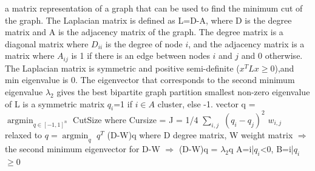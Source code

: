 \documentclass[10pt]{article}
\begin{document}
\smallbreak
{}
 a matrix representation of a graph that can be used to find the minimum cut of the graph. The Laplacian matrix is defined as L=D-A, where D is the degree matrix and A is the adjacency matrix of the graph. The degree matrix is a diagonal matrix where $D_{ii}$ is the degree of node $i$, and the adjacency matrix is a matrix where $A_{ij}$ is 1 if there is an edge between nodes $i$ and $j$ and 0 otherwise. The Laplacian matrix is symmetric and positive semi-definite ($x^TLx\geq0$),and min eigenvalue is 0. The eigenvector that corresponds to the second minimum eigenvalue $\lambda_2$ gives the best bipartite graph partition
 smallest non-zero eigenvalue of L
 is a symmetric matrix
  $q_i$=1 if $i \in A$ cluster, else -1. vector q = $\operatorname{argmin}_{q\in [-1,1]^n}$ CutSize where Cursize = J = 1/4 $\sum_{i,j}$ $(q_i- q_j )^2$ $w_{i,j}$ relaxed to $q = \operatorname{argmin}_{q}$ $q^T$ (D-W)q where D degree matrix, W weight matrix $\Rightarrow$ the second minimum eigenvector for D-W $\Rightarrow$ (D-W)q = $\lambda_2$q
 A={i|$q_i$<0}, B={i|$q_i$$\geq$0}
\end{document}
